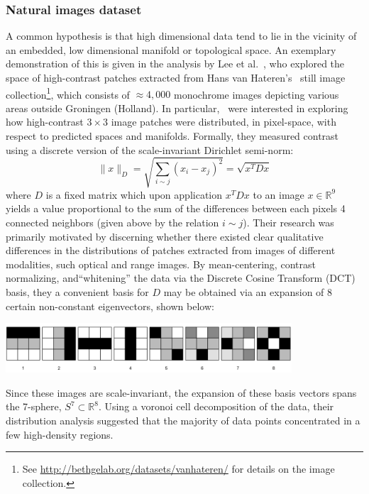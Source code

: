 \documentclass[sn-mathphys]{sn-jnl}
\begin{document}
 \subsubsection{Natural images dataset}\label{sec:natural_images}
A common hypothesis is that high dimensional data tend to lie in the vicinity of an embedded, low dimensional manifold or topological space. An exemplary demonstration of this is given in the analysis by Lee et al.~\cite{lee2003nonlinear}, who explored the space of high-contrast patches extracted from Hans van Hateren's~\cite{hateren_schaaf_1998} still image collection\footnote{See \url{http://bethgelab.org/datasets/vanhateren/} for details on the image collection.}, which consists of $\approx 4,000$ monochrome images depicting various areas outside Groningen (Holland). 
In particular,~\cite{lee2003nonlinear} were interested in exploring how high-contrast $3 \times 3$ image patches  were distributed, in pixel-space, with respect to predicted spaces and manifolds.
Formally, they measured contrast using a discrete version of the scale-invariant Dirichlet semi-norm:
$$ \lVert x \rVert_D = \sqrt{\sum_{i \sim j}(x_i - x_j)^2} = \sqrt{x^T D x}$$
where $D$ is a fixed matrix which upon application $x^T D x$ to an image $x \in \mathbb{R}^9$ yields a value proportional to the sum of the differences between each pixels 4 connected neighbors (given above by the relation $i \sim j$).
Their research was primarily motivated by discerning whether there existed clear qualitative differences in the distributions of patches extracted from images of different modalities, such optical and range images.
By mean-centering, contrast normalizing, and``whitening'' the data via the Discrete Cosine Transform (DCT) basis, they a convenient basis for $D$ may be obtained via an expansion of 8 certain non-constant eigenvectors, shown below: 
\begin{center}
	\includegraphics[width=0.80\textwidth]{dct_basis} 
\end{center}
Since these images are scale-invariant, the expansion of these basis vectors spans the 7-sphere, $S^7 \subset \mathbb{R}^8$. Using a voronoi cell decomposition of the data, their distribution analysis suggested that the majority of data points concentrated in a few high-density regions. 
\end{document}
